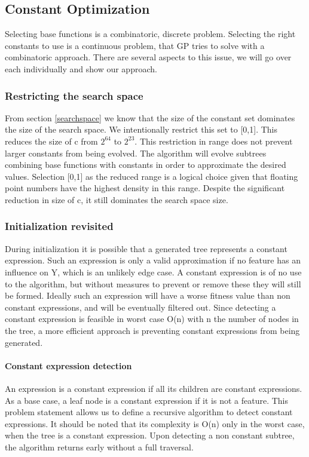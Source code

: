\subsection{Constant Optimization} \label{subconstantoptimization}
Selecting base functions is a combinatoric, discrete problem. Selecting the right constants to use is a continuous problem, that GP tries to solve with a combinatoric approach. There are several aspects to this issue, we will go over each individually and show our approach. 

\subsubsection{Restricting the search space}
From section \ref{searchspace} we know that the size of the constant set dominates the size of the search space. We intentionally restrict this set to [0,1]. This reduces the size of c from $2^{64}$ to $2^{23}$. This restriction in range does not prevent larger constants from being evolved. The algorithm will evolve subtrees combining base functions with constants in order to approximate the desired values. Selection [0,1] as the reduced range is a logical choice given that floating point numbers have the highest density in this range. Despite the significant reduction in size of c, it still dominates the search space size.

\subsubsection{Initialization revisited}
During initialization it is possible that a generated tree represents a constant expression. Such an expression is only a valid approximation if no feature has an influence on Y, which is an unlikely edge case. A constant expression is of no use to the algorithm, but without measures to prevent or remove these they will still be formed. Ideally such an expression will have a worse fitness value than non constant expressions, and will be eventually filtered out. Since detecting a constant expression is feasible in worst case O(n) with n the number of nodes in the tree, a more efficient approach is preventing constant expressions from being generated. 

\paragraph{Constant expression detection}
An expression is a constant expression if all its children are constant expressions. As a base case, a leaf node is a constant expression if it is not a feature. This problem statement allows us to define a recursive algorithm to detect constant expressions. It should be noted that its complexity is O(n) only in the worst case, when the tree is a constant expression. Upon detecting a non constant subtree, the algorithm returns early without a full traversal. 

